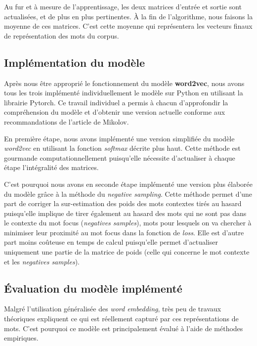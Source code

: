 \documentclass[11pt,french,french]{article}
\begin{document}
Au fur et à mesure de l'apprentissage, les deux matrices d'entrée et
sortie sont actualisées, et de plus en plus pertinentes. À la fin de
l'algorithme, nous faisons la moyenne de ces matrices. C'est cette
moyenne qui représentera les vecteurs finaux de représentation des mots
du corpus.

\hypertarget{impluxe9mentation-du-moduxe8le}{%
\subsection{Implémentation du
modèle}\label{impluxe9mentation-du-moduxe8le}}

Après nous être approprié le fonctionnement du modèle \textbf{word2vec},
nous avons tous les trois implémenté individuellement le modèle sur
Python en utilisant la librairie Pytorch. Ce travail individuel a permis
à chacun d'approfondir la compréhension du modèle et d'obtenir une
version actuelle conforme aux recommandations de l'article de Mikolov.

En première étape, nous avons implémenté une version simplifiée du
modèle \emph{word2vec} en utilisant la fonction \emph{softmax} décrite
plus haut. Cette méthode est gourmande computationnellement puisqu'elle
nécessite d'actualiser à chaque étape l'intégralité des matrices.

C'est pourquoi nous avons en seconde étape implémenté une version plus
élaborée du modèle grâce à la méthode du \emph{negative sampling}. Cette
méthode permet d'une part de corriger la sur-estimation des poids des
mots contextes tirés au hasard puisqu'elle implique de tirer également
au hasard des mots qui ne sont pas dans le contexte du mot focus
(\emph{negatives samples}), mots pour lesquels on va chercher à
minimiser leur proximité au mot focus dans la fonction de \emph{loss}.
Elle est d'autre part moins coûteuse en temps de calcul puisqu'elle
permet d'actualiser uniquement une partie de la matrice de poids (celle
qui concerne le mot contexte et les \emph{negatives samples}).

\hypertarget{uxe9valuation-du-moduxe8le-impluxe9mentuxe9}{%
\subsection{Évaluation du modèle
implémenté}\label{uxe9valuation-du-moduxe8le-impluxe9mentuxe9}}

Malgré l'utilisation généralisée des \emph{word embedding}, très peu de
travaux théoriques expliquent ce qui est réellement capturé par ces
représentations de mots. C'est pourquoi ce modèle est principalement
évalué à l'aide de méthodes empiriques.
\end{document}
